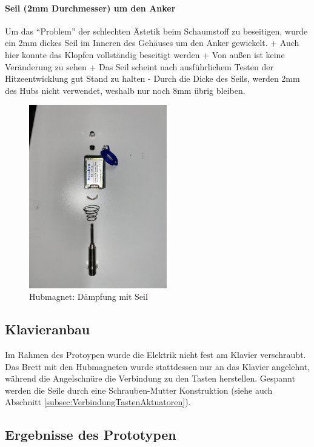 \paragraph{Seil (2mm Durchmesser) um den Anker}

Um das \enquote{Problem} der schlechten Ästetik beim Schaumstoff zu beseitigen, wurde ein 2mm dickes Seil im Inneren des Gehäuses um den Anker gewickelt. \newline
+ Auch hier konnte das Klopfen vollständig beseitigt werden \newline
+ Von außen ist keine Veränderung zu sehen \newline
+ Das Seil scheint nach ausführlichem Testen der Hitzeentwicklung gut Stand zu halten  \newline
- Durch die Dicke des Seils, werden 2mm des Hubs nicht verwendet, weshalb nur noch 8mm übrig bleiben.

\begin{figure}[htbp]
    \centering
    \includegraphics [width=6cm] {img/Hubmagnet_Seil_Daempfung.jpg}
    \caption{Hubmagnet: Dämpfung mit Seil}
\end{figure}


\subsection{Klavieranbau}
Im Rahmen des Protoypen wurde die Elektrik nicht fest am Klavier verschraubt.
Das Brett mit den Hubmagneten wurde stattdessen nur an das Klavier angelehnt, während die Angelschnüre die Verbindung zu den Tasten herstellen.
Gespannt werden die Seile durch eine Schrauben-Mutter Konstruktion (siehe auch Abschnitt \ref{subsec:VerbindungTastenAktuatoren}).

\subsection{Ergebnisse des Prototypen}\label{ErgebnissePrototyp}

